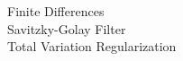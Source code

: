 \documentclass[preview]{standalone}
\begin{document}
Finite Differences\\Savitzky-Golay Filter\\Total Variation Regularization\\
\end{document}
